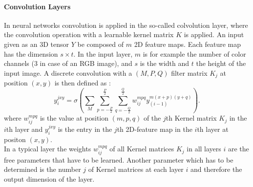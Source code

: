\paragraph{Convolution Layers}

In neural networks convolution is applied in the so-called colvolution layer, where the convolution operation with a learnable kernel matrix $K$ is applied. An input given as an 3D tensor $Y$ be composed of $m$ 2D feature maps. Each feature map has the dimension $s \times t$. In the input layer, $m$ is for example the number of color channels (3 in case of an RGB image), and $s$ is the width and $t$ the height of the input image. A discrete convolution with a $(M , P , Q)$ filter matrix $K_j$ at position $(x,y)$ is then defined as : 
\[
y_{i}^{jxy} = \sigma(\sum_M \sum_{p=-\frac{P}{2}}^{\frac{P}{2}} \sum_{q=-\frac{Q}{2}}^{\frac{Q}{2}} w_{ij}^{mpq} y_{(i-1)}^{m(x+p)(y+q)}) .
\]
where $w_{ij}^{mpq}$ is the value at position $(m,p,q)$ of the $j$th Kernel matrix $K_j$ in the $i$th layer and $y_{i}^{jxy}$ is the entry in the $j$th 2D-feature map in the $i$th layer at positon $(x, y)$.\\
In a typical layer the weights $w_{ij}^{mpq}$ of all Kernel matrices $K_j$ in all layers $i$ are the free parameters that have to be learned. Another parameter which has to be determined is the number $j$ of Kernel matrices at each layer $i$ and therefore the output dimension of the layer.



